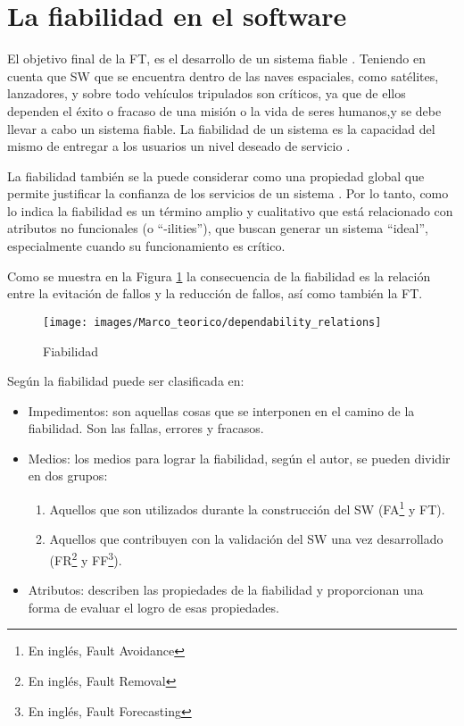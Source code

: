 \section{La fiabilidad en el software}
El objetivo final de la \ac{FT}, es el desarrollo de un sistema fiable \citep{FTDesign}. Teniendo
en cuenta que \ac{SW} que se encuentra dentro de las naves espaciales, como satélites,
lanzadores, y sobre todo vehículos tripulados son críticos, ya que de ellos dependen el éxito o
fracaso de una misión o la vida de seres humanos,y se debe llevar a cabo un sistema fiable.
La fiabilidad de un sistema es la capacidad del mismo de entregar a los usuarios un nivel
deseado de servicio \citep{FTDesign}.

La fiabilidad también se la puede considerar como una propiedad global que permite justificar la
confianza de los servicios de un sistema \citep{FTAvionics}. Por lo tanto, como lo indica
\cite{FTAvionics} la fiabilidad es un término amplio y cualitativo que está relacionado con
atributos no funcionales (o ``-ilities''), que buscan generar un sistema ``ideal'', especialmente
cuando su funcionamiento es crítico.

Como se muestra en la Figura \ref{fig:dependability_relations} la consecuencia de la fiabilidad es
la relación entre la evitación de fallos y la reducción de fallos, así como también la \ac{FT}.

\begin{figure}[h]
 \centering
 \texttt{[image: images/Marco\_teorico/dependability\_relations]}
  \caption{Fiabilidad \protect\citep{FTAvionics}}
\label{fig:dependability_relations}
\end{figure}

Según \cite{Pullum01} la fiabilidad puede ser clasificada en:
\begin{itemize}
 \item Impedimentos: son aquellas cosas que se interponen en el camino de la fiabilidad. Son las
fallas, errores y fracasos.
 \item Medios: los medios para lograr la fiabilidad, según el autor, se pueden dividir en dos
grupos:
  \begin{enumerate}
    \item Aquellos que son utilizados durante la construcción del \ac{SW} (\ac{FA}\footnote{En
    inglés, Fault Avoidance} y \ac{FT}).
    \item Aquellos que contribuyen con la validación del \ac{SW} una vez desarrollado
    (\ac{FR}\footnote{En inglés, Fault Removal} y \ac{FF}\footnote{En inglés, Fault Forecasting}).
  \end{enumerate}

 \item Atributos: describen las propiedades de la fiabilidad y proporcionan una forma de evaluar el
logro de esas propiedades.
\end{itemize}

